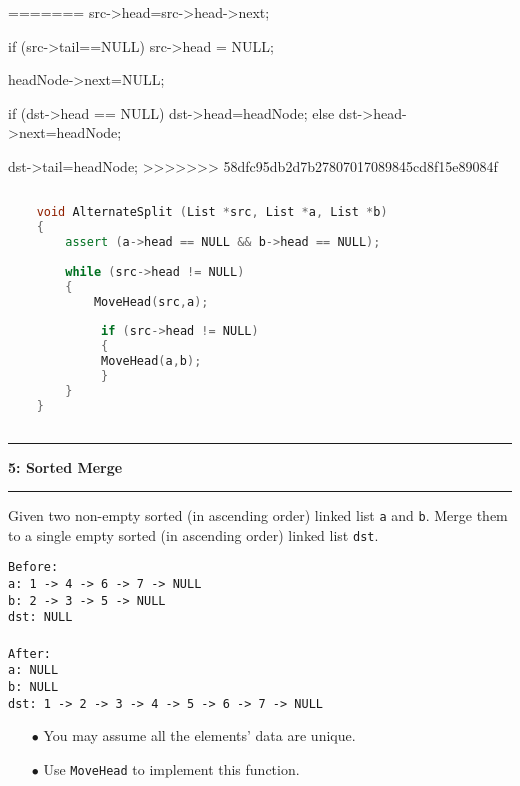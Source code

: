 \documentclass[10.5pt]{article}
\newcommand\question[2]{\vspace{.25in}\hrule\textbf{#1: #2}\vspace{.5em}\hrule\vspace{.10in}}
\begin{document}
=======
    src->head=src->head->next;
    
        
    if (src->tail==NULL)
    {
        src->head = NULL;
    }
    
    headNode->next=NULL;
    
    if (dst->head == NULL)
    {
       dst->head=headNode;
    }
    else
    {
        dst->head->next=headNode;
    }
    
    dst->tail=headNode;
>>>>>>> 58dfc95db2d7b27807017089845cd8f15e89084f
    
    \hrulefill
    \begin{lstlisting}[language=C++]
    
    void AlternateSplit (List *src, List *a, List *b)
    {
        assert (a->head == NULL && b->head == NULL);
        
        while (src->head != NULL)
        {
            MoveHead(src,a);
    
             if (src->head != NULL)
             {
             MoveHead(a,b);
             }
        }
    }
    
    \end{lstlisting}
    \pagebreak
    
    
    \question{5}{Sorted Merge}
    Given two non-empty sorted (in ascending order) linked list \texttt{a} and \texttt{b}. Merge them to a single empty sorted (in ascending order) linked list \texttt{dst}.
    
    \texttt{Before:}\\
    \texttt{a: 1 -> 4 -> 6 -> 7 -> NULL}\\
    \texttt{b: 2 -> 3 -> 5 -> NULL}\\
    \texttt{dst: NULL}\\
    \\
    \texttt{After:}\\
    \texttt{a: NULL}\\
    \texttt{b: NULL}\\
    \texttt{dst: 1 -> 2 -> 3 -> 4 -> 5 -> 6 -> 7 -> NULL}\\
    
    \begin{enumerate}
        \item[$\bullet$] You may assume all the elements' data are unique.
        \item[$\bullet$] Use \texttt{MoveHead} to implement this function.
    \end{enumerate}
    \newpage
    
\end{document}
